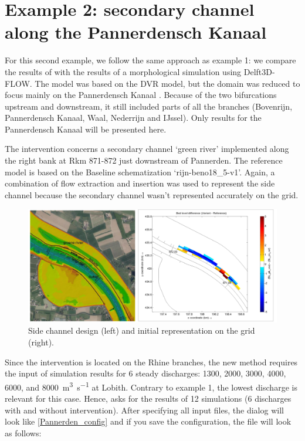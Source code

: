 \section{Example 2: secondary channel along the Pannerdensch Kanaal}

For this second example, we follow the same approach as example 1: we compare the results of \dfastmi with the results of a morphological simulation using Delft3D-FLOW.
The model was based on the DVR model, but the domain was reduced to focus mainly on the Pannerdensch Kanaal \citep{BomLeeuwen2020}.
Because of the two bifurcations upstream and downstream, it still included parts of all the branches (Bovenrijn, Pannerdensch Kanaal, Waal, Nederrijn and IJssel).
Only results for the Pannerdensch Kanaal will be presented here.

The intervention concerns a secondary channel `green river' implemented along the right bank at Rkm 871-872 just downstream of Pannerden.
The reference model is based on the Baseline schematization ‘rijn-beno18\_5-v1’.
Again, a combination of flow extraction and insertion was used to represent the side channel because the secondary channel wasn't represented accurately on the grid.

\begin{figure}
\includegraphics[width=\columnwidth]{figures/Pannerden_proj.png}
\caption{Side channel design (left) and initial representation on the grid (right).}
\label{Pannerden_proj}
\end{figure}

Since the intervention is located on the Rhine branches, the new \dfastmi method requires the input of simulation results for 6 steady discharges: 1300, 2000, 3000, 4000, 6000, and \SI{8000}{\metre\cubed\per\second} at Lobith.
Contrary to example 1, the lowest discharge is relevant for this case.
Hence, \dfmi asks for the results of 12 simulations (6 discharges with and without intervention).
After specifying all input files, the dialog will look like \autoref{Pannerden_config} and if you save the configuration, the file will look as follows:

